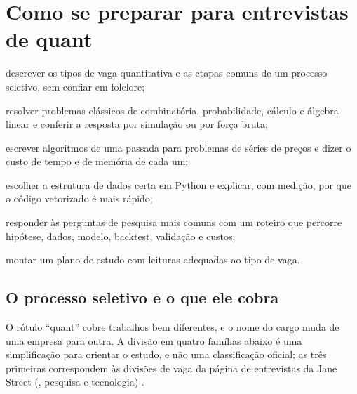 \chapter{Como se preparar para entrevistas de quant}
\label{cap:entrevistas}


\begin{objetivos}
  \item descrever os tipos de vaga quantitativa e as etapas comuns de um processo seletivo, sem confiar em folclore;
  \item resolver problemas clássicos de combinatória, probabilidade, cálculo e álgebra linear e conferir a resposta por simulação ou por força bruta;
  \item escrever algoritmos de uma passada para problemas de séries de preços e dizer o custo de tempo e de memória de cada um;
  \item escolher a estrutura de dados certa em Python e explicar, com medição, por que o código vetorizado é mais rápido;
  \item responder às perguntas de pesquisa mais comuns com um roteiro que percorre hipótese, dados, modelo, backtest, validação e custos;
  \item montar um plano de estudo com leituras adequadas ao tipo de vaga.
\end{objetivos}

\section{O processo seletivo e o que ele cobra}
\label{sec:c16-processo}

O rótulo ``quant'' cobre trabalhos bem diferentes, e o nome do cargo muda de uma empresa para outra. A divisão em quatro famílias abaixo é uma simplificação para orientar o estudo, e não uma classificação oficial; as três primeiras correspondem às divisões de vaga da página de entrevistas da Jane Street (, pesquisa e tecnologia) \citep{janestreet2026}.

